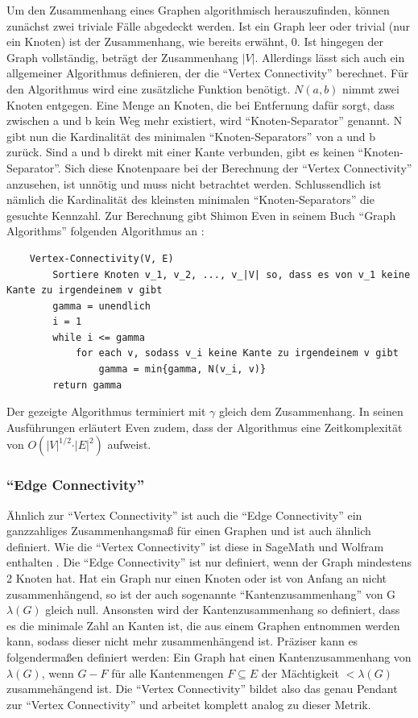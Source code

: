 \documentclass[a4paper,12pt,ngerman,chapterprefix=false,listof=totoc,bibliography=totoc]{scrreprt}
\begin{document}
{Um den Zusammenhang eines Graphen algorithmisch herauszufinden, können zunächst zwei triviale Fälle abgedeckt werden. Ist ein Graph leer oder trivial (nur ein Knoten) ist der Zusammenhang, wie bereits erwähnt, 0. Ist hingegen der Graph vollständig, beträgt der Zusammenhang \(\vert V\vert\). Allerdings lässt sich auch ein allgemeiner Algorithmus definieren, der die "`Vertex Connectivity"' berechnet.  Für den Algorithmus wird eine zusätzliche Funktion benötigt. \(N(a,b)\) nimmt zwei Knoten entgegen. Eine Menge an Knoten, die bei Entfernung dafür sorgt, dass zwischen a und b kein Weg mehr existiert, wird "`Knoten-Separator"' genannt. N gibt nun die Kardinalität des minimalen "`Knoten-Separators"' von a und b zurück. Sind a und b direkt mit einer Kante verbunden, gibt es keinen "`Knoten-Separator"'. Sich diese Knotenpaare bei der Berechnung der "`Vertex Connectivity"' anzusehen, ist unnötig und muss nicht betrachtet werden. Schlussendlich ist nämlich die Kardinalität des kleinsten minimalen "`Knoten-Separators"' die gesuchte Kennzahl. Zur Berechnung gibt Shimon Even in seinem Buch "`Graph Algorithms"' folgenden Algorithmus an \cite{even_graph_2012}:
\begin{lstlisting}
	Vertex-Connectivity(V, E)
		Sortiere Knoten v_1, v_2, ..., v_|V| so, dass es von v_1 keine Kante zu irgendeinem v gibt
		gamma = unendlich
		i = 1
		while i <= gamma
			for each v, sodass v_i keine Kante zu irgendeinem v gibt
				gamma = min{gamma, N(v_i, v)}
		return gamma
\end{lstlisting}
Der gezeigte Algorithmus terminiert mit \(\gamma\) gleich dem Zusammenhang. In seinen Ausführungen erläutert Even zudem, dass der Algorithmus eine Zeitkomplexität von \(O(\vert V\vert^{1/2} \cdot \vert E\vert^2)\) aufweist.
}
\subsubsection*{"`Edge Connectivity"'}
{
Ähnlich zur "`Vertex Connectivity"' ist auch die "`Edge Connectivity"' ein ganzzahliges Zusammenhangsmaß für einen Graphen und ist auch ähnlich definiert. Wie die "`Vertex Connectivity"' ist diese in SageMath und Wolfram enthalten \cite{sagemath_graph_2020,wolfram_graph_2020}. Die "`Edge Connectivity"' ist nur definiert, wenn der Graph mindestens 2 Knoten hat. Hat ein Graph nur einen Knoten oder ist von Anfang an nicht zusammenhängend, so ist der auch sogenannte "`Kantenzusammenhang"' von G \(\lambda (G)\) gleich null. Ansonsten wird der Kantenzusammenhang so definiert, dass es die minimale Zahl an Kanten ist, die aus einem Graphen entnommen werden kann, sodass dieser nicht mehr zusammenhängend ist. Präziser kann es folgendermaßen definiert werden: Ein Graph hat einen Kantenzusammenhang von \(\lambda (G)\), wenn \(G - F\) für alle Kantenmengen \(F\subseteq E\) der Mächtigkeit \(< \lambda (G)\) zusammehängend ist. \cite{diestel_graphentheorie_2000} Die "`Vertex Connectivity"' bildet also das genau Pendant zur "`Vertex Connectivity"' und arbeitet komplett analog zu dieser Metrik.

}
\end{document}
